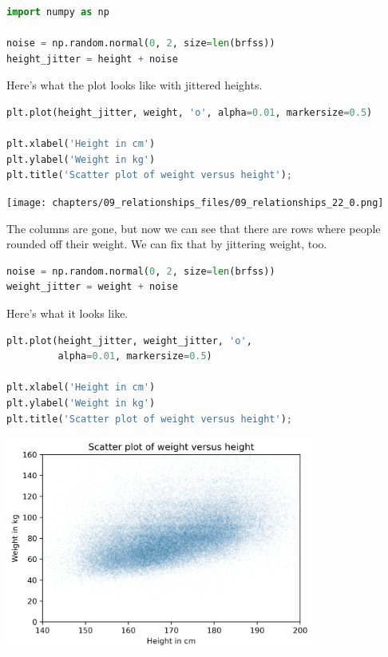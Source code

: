\begin{lstlisting}[language=Python,style=source]
import numpy as np

noise = np.random.normal(0, 2, size=len(brfss))
height_jitter = height + noise
\end{lstlisting}

Here's what the plot looks like with jittered heights.

\begin{lstlisting}[language=Python,style=source]
plt.plot(height_jitter, weight, 'o', alpha=0.01, markersize=0.5)

plt.xlabel('Height in cm')
plt.ylabel('Weight in kg')
plt.title('Scatter plot of weight versus height');
\end{lstlisting}

\begin{center}
\texttt{[image: chapters/09\_relationships\_files/09\_relationships\_22\_0.png]}
\end{center}

The columns are gone, but now we can see that there are rows where
people rounded off their weight. We can fix that by jittering weight,
too.

\begin{lstlisting}[language=Python,style=source]
noise = np.random.normal(0, 2, size=len(brfss))
weight_jitter = weight + noise
\end{lstlisting}

Here's what it looks like.

\begin{lstlisting}[language=Python,style=source]
plt.plot(height_jitter, weight_jitter, 'o', 
         alpha=0.01, markersize=0.5)

plt.xlabel('Height in cm')
plt.ylabel('Weight in kg')
plt.title('Scatter plot of weight versus height');
\end{lstlisting}

\begin{center}
\includegraphics[width=4in]{chapters/09_relationships_files/09_relationships_26_0.png}
\end{center}

